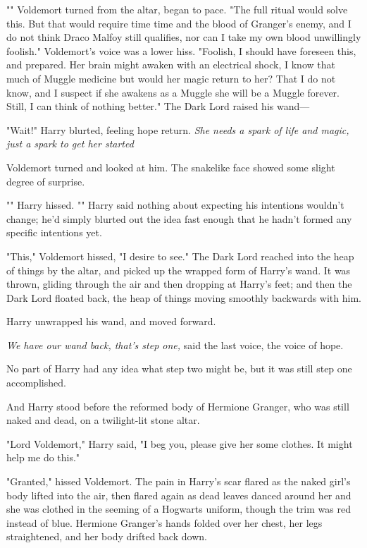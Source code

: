 "" Voldemort turned from the altar,
began to pace. "The full ritual would solve this. But that would require
time{\el} time and the blood of Granger's enemy, and I do not think Draco
Malfoy still qualifies, nor can I take my own blood unwillingly{\el}
foolish." Voldemort's voice was a lower hiss. "Foolish, I should have foreseen
this, and prepared. Her brain might awaken with an electrical shock, I know
that much of Muggle medicine{\el} but would her magic return to her? That I
do not know, and I suspect if she awakens as a Muggle she will be a Muggle
forever. Still, I can think of nothing better." The Dark Lord raised his wand---

"Wait!" Harry blurted, feeling hope return. \emph{She needs a spark of life and
magic, just a spark to get her started{\el}}

Voldemort turned and looked at him. The snakelike face showed some slight
degree of surprise.

"" Harry hissed. "" Harry said nothing about
expecting his intentions wouldn't change; he'd simply blurted out the idea fast
enough that he hadn't formed any specific intentions yet.

"This," Voldemort hissed, "I desire to see." The Dark Lord reached into the
heap of things by the altar, and picked up the wrapped form of Harry's wand. It
was thrown, gliding through the air and then dropping at Harry's feet; and then
the Dark Lord floated back, the heap of things moving smoothly backwards with
him.

Harry unwrapped his wand, and moved forward.

\emph{We have our wand back, that's step one,} said the last voice, the voice
of hope.

No part of Harry had any idea what step two might be, but it was still step one
accomplished.

And Harry stood before the reformed body of Hermione Granger, who was still
naked and dead, on a twilight-lit stone altar.

"Lord Voldemort," Harry said, "I beg you, please give her some clothes. It
might help me do this."

"Granted," hissed Voldemort. The pain in Harry's scar flared as the naked
girl's body lifted into the air, then flared again as dead leaves danced around
her and she was clothed in the seeming of a Hogwarts uniform, though the trim
was red instead of blue. Hermione Granger's hands folded over her chest, her
legs straightened, and her body drifted back down.

